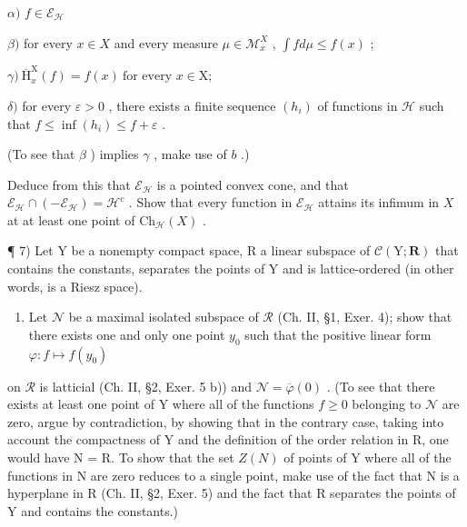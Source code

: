 \(\alpha)\) \(f\in \mathcal{E}_{\mathcal{H}}\)

\(\beta)\) for every \(x \in X\) and every measure \(\mu \in \mathcal{M}_x^X\) , \(\int f d\mu \leqslant f(x)\) ;

\(\gamma)\ \overline{\mathrm{H}}_{x}^{\mathrm{X}}(f) = f(x)\ \text{for every } x \in \mathrm{X};\)

\(\delta)\) for every \(\varepsilon > 0\) , there exists a finite sequence \((h_i)\) of functions in \(\mathcal{H}\) such that \(f \leqslant \inf(h_i) \leqslant f + \varepsilon\) .

(To see that \(\beta\) ) implies \(\gamma\) , make use of \(b\) .)

Deduce from this that \(\mathcal{E}_{\mathcal{H}}\) is a pointed convex cone, and that \(\mathcal{E}_{\mathcal{H}} \cap (-\mathcal{E}_{\mathcal{H}}) = \mathcal{H}^c\) . Show that every function in \(\mathcal{E}_{\mathcal{H}}\) attains its infimum in \(X\) at at least one point of \(\mathrm{Ch}_{\mathcal{H}}(X)\) .

¶ 7) Let Y be a nonempty compact space, R a linear subspace of \(\mathcal{C}(\mathrm{Y};\mathbf{R})\) that contains the constants, separates the points of Y and is lattice-ordered (in other words, is a Riesz space).

\begin{enumerate}
\def\labelenumi{\alph{enumi})}
\tightlist
\item
  Let \(\mathcal{N}\) be a maximal isolated subspace of \(\mathcal{R}\) (Ch. II, §1, Exer. 4); show that there exists one and only one point \(y_0\) such that the positive linear form \(\varphi : f \mapsto f(y_0)\)
\end{enumerate}

on \(\mathcal{R}\) is latticial (Ch. II, §2, Exer. 5 b)) and \(\mathcal{N} = \overline{\varphi}(0)\) . (To see that there exists at least one point of Y where all of the functions \(f \geqslant 0\) belonging to \(\mathcal{N}\) are zero, argue by contradiction, by showing that in the contrary case, taking into account the compactness of Y and the definition of the order relation in R, one would have N = R. To show that the set \(Z(N)\) of points of Y where all of the functions in N are zero reduces to a single point, make use of the fact that N is a hyperplane in R (Ch. II, §2, Exer. 5) and the fact that R separates the points of Y and contains the constants.)

